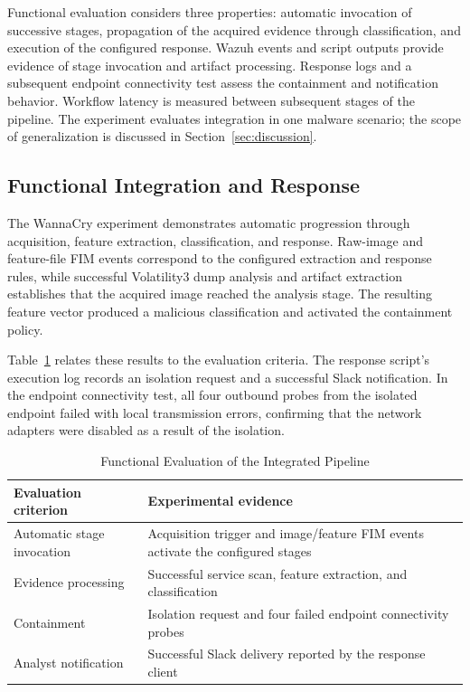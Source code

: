 \documentclass[conference]{IEEEtran}
\begin{document}
Functional evaluation considers three properties: automatic invocation of successive stages, propagation of the acquired evidence through classification, and execution of the configured response. Wazuh events and script outputs provide evidence of stage invocation and artifact processing. Response logs and a subsequent endpoint connectivity test assess the containment and notification behavior. Workflow latency is measured between subsequent stages of the pipeline.
The experiment evaluates integration in one malware scenario; the scope of generalization is discussed in Section~\ref{sec:discussion}.

\subsection{Functional Integration and Response}
The WannaCry experiment demonstrates automatic progression through acquisition, feature extraction, classification, and response. Raw-image and feature-file FIM events correspond to the configured extraction and response rules, while successful Volatility3 dump analysis and artifact extraction establishes that the acquired image reached the analysis stage. The resulting feature vector produced a malicious classification and activated the containment policy.

Table~\ref{tab:observations} relates these results to the evaluation criteria. The response script's execution log records an isolation request and a successful Slack notification. In the endpoint connectivity test, all four outbound probes from the isolated endpoint failed with local transmission errors, confirming that the network adapters were disabled as a result of the isolation.

\begin{table}[t]
\caption{Functional Evaluation of the Integrated Pipeline}
\label{tab:observations}
\centering
\footnotesize
\begin{tabular}{@{}p{2.5cm}p{5.55cm}@{}}
\toprule
Evaluation criterion & Experimental evidence \\
\midrule
Automatic stage invocation & Acquisition trigger and image/feature FIM events activate the configured stages \\
Evidence processing & Successful service scan, feature extraction, and classification \\
Containment & Isolation request and four failed endpoint connectivity probes \\
Analyst notification & Successful Slack delivery reported by the response client \\
\bottomrule
\end{tabular}
\end{table}
\end{document}
